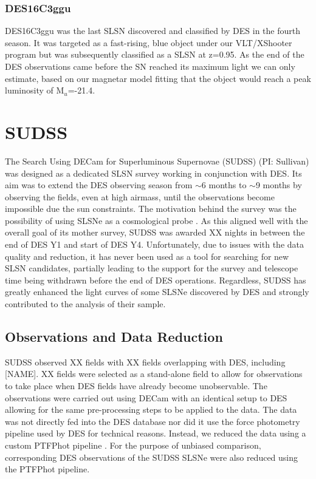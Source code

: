 \subsubsection{DES16C3ggu}
DES16C3ggu was the last SLSN discovered and classified by DES in the fourth season. It was targeted as a fast-rising, blue object under our VLT/XShooter program but was subsequently classified as a SLSN at z=0.95. As the end of the DES observations came before the SN reached its maximum light we can only estimate, based on our magnetar model fitting that the object would reach a peak luminosity of M$_u$=-21.4.

\section{SUDSS}
The Search Using DECam for Superluminous Supernovae (SUDSS) (PI: Sullivan) was designed as a dedicated SLSN survey working in conjunction with DES. Its aim was to extend the DES observing season from $\sim$6 months to $\sim$9 months by observing the fields, even at high airmass, until the observations become impossible due the sun constraints. The motivation behind the survey was the possibility of using SLSNe as a cosmological probe \citep{Inserra2014}. As this aligned well with the overall goal of its mother survey, SUDSS was awarded XX nights in between the end of DES Y1 and start of DES Y4. Unfortunately, due to issues with the data quality and reduction, it has never been used as a tool for searching for new SLSN candidates, partially leading to the support for the survey and telescope time being withdrawn before the end of DES operations. Regardless, SUDSS has greatly enhanced the light curves of some SLSNe discovered by DES and strongly contributed to the analysis of their sample.

\subsection{Observations and Data Reduction}
SUDSS observed XX fields with XX fields overlapping with DES, including [NAME]. XX fields were selected as a stand-alone field to allow for observations to take place when DES fields have already become unobservable. The observations were carried out using DECam with an identical setup to DES allowing for the same pre-processing steps to be applied to the data. The data was not directly fed into the DES database nor did it use the force photometry pipeline used by DES for technical reasons. Instead, we reduced the data using a custom PTFPhot pipeline \citep{Firth2015}. For the purpose of unbiased comparison, corresponding DES observations of the SUDSS SLSNe were also reduced using the PTFPhot pipeline.

